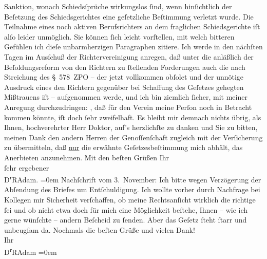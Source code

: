 \begin{ledgroupsized}[t]{13cm}
               Sanktion, wonach Schiedsſprüche wirkungs{\pb}los ſind, wenn hinſichtlich der Beſetzung des Schiedsgerichtes eine geſetzliche
               Beſtimmung verletzt wurde. Die Teilnahme eines noch aktiven Berufsrichters an dem
               fraglichen Schiedsgerichte iſt alſo leider unmöglich.\pend
           \pstart
           Sie können ſich leicht vorſtellen, mit welch bitteren Gefühlen ich dieſe
               unbarmherzigen Paragraphen zitiere.\pend
           \pstart
           Ich werde in den nächſten Tagen im Ausſchuß der Richtervereinigung anregen, daß unter die anläßlich der Beſoldungsreform von
               den Richtern zu ſtellenden Forderungen auch die nach Streichung des § 578 ZPO – der
               jetzt vollkommen obſolet und der unnötige Ausdruck eines den Richtern gegenüber bei
               Schaffung des Geſetzes gehegten Mißtrauens iſt – aufgenommen werde, und ich bin
               ziemlich ſicher, mit meiner Anregung durchzudringen: \label{K_L02357_1v}\label{K_L02357_1h}, daß für den Verein meine Perſon noch in Betracht kommen
               könnte, iſt doch ſehr zweifelhaft.\pend
           \pstart
           {\pb}Es bleibt mir demnach nichts übrig, als
               Ihnen, hochverehrter Herr Doktor, auf’s herzlichſte zu danken und Sie zu bitten,
               meinen Dank den andern Herren der Genoſſenſchaft zugleich mit der Verſicherung zu übermitteln, daß \uline{nur} die erwähnte Geſetzesbeſtimmung mich abhält, das
               Anerbieten anzunehmen.\pend
           \pstart
           Mit den beſten Grüßen Ihr{\\[\baselineskip]}ſehr ergebener{\\[\baselineskip]}\spacefill\mbox{D\textsuperscript{r}RAdam.}\pend
           \leftskip=0em{}\pstart
           \noindent{}Nachſchrift vom 3. November:\pend
           \pstart
           Ich bitte wegen Verzögerung der Abſendung des Briefes um Entſchuldigung. Ich wollte
               vorher durch Nachfrage bei Kollegen mir Sicherheit verſchaffen, ob meine
               Rechtsanſicht wirklich die richtige ſei und ob nicht etwa doch für mich eine
               Möglichkeit beſtehe, Ihnen – wie ich gerne wünſchte – andern Beſcheid zu ſenden. Aber
                  {\pb}das Geſetz ſteht ſtarr und unbeugſam
               da.\pend
           \pstart
           Nochmals die beſten Grüße und vielen Dank!{\\[\baselineskip]}Ihr{\\[\baselineskip]}\spacefill\mbox{D\textsuperscript{r}RAdam}\pend
           \leftskip=0em{}
         

\end{ledgroupsized}
